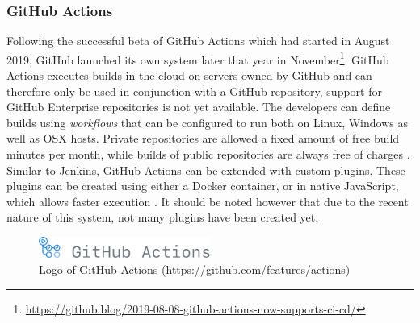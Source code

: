 
\subsubsection{GitHub Actions}
Following the successful beta of GitHub Actions which had started in August 2019, GitHub launched its own \CI{} system later that year in November\footnote{\url{https://github.blog/2019-08-08-github-actions-now-supports-ci-cd/}}. GitHub Actions executes builds in the cloud on servers owned by GitHub and can therefore only be used in conjunction with a GitHub repository, support for GitHub Enterprise repositories is not yet available. The developers can define builds using \emph{workflows} that can be configured to run both on Linux, Windows as well as OSX hosts. Private repositories are allowed a fixed amount of free build minutes per month, while builds of public repositories are always free of charges \cite{githubactions}. Similar to Jenkins, GitHub Actions can be extended with custom plugins. These plugins can be created using either a Docker container, or in native JavaScript, which allows faster execution \cite{aboutgithubactions}. It should be noted however that due to the recent nature of this system, not many plugins have been created yet.

\begin{figure}[htbp!]
	\centering
	\includegraphics[width=0.5\textwidth]{assets/github-actions.pdf}
	\caption{Logo of GitHub Actions (\url{https://github.com/features/actions})}
	\label{fig:github-actions}
\end{figure}